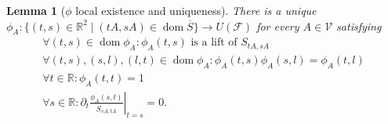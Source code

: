 \documentclass[b5paper,draft,openbib,12pt]{memoir}
\newtheorem{Lemma}[Def]{Lemma}
\DeclareMathOperator{\dom}{dom}
\begin{document}
\begin{Lemma}[\(\phi\) local existence and uniqueness]\label{lem phi local}
There is a unique \(\phi_A:\{(t,s)\in\mathbb{R}^2\mid (t A, s A)\in \dom\overline{S}\} \rightarrow U(\mathcal{F})\) for every \(A\in\mathcal{V}\)
satisfying
\begin{align}\label{phi prop1}
\forall (t,s)\in \dom \phi_A: \phi_A(t,s) \text{ is a lift of } S_{tA, sA}\\\label{phi prop2}
\forall (t,s),(s,l),(l,t)\in \dom\phi_A: \phi_A(t,s)\phi_A(s,l)=\phi_A(t,l)\\\label{phi prop3}
\forall t\in\mathbb{R}: \phi_A(t,t)=1\\\label{phi prop4}
\forall s\in\mathbb{R}: \partial_{t} \left.\frac{\phi_A(s,t)}{\overline{S}_{sA,tA}}\right|_{t=s}=0.
\end{align}
\end{Lemma}
\end{document}
